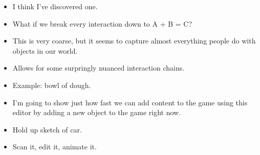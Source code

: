 \documentclass[12pt]{article}
\begin{document}
{\begin{itemize}
\item I think I've discovered one.

\item What if we break every interaction down to A + B = C?

\item This is very coarse, but it seems to capture almost everything people do with objects in our world.

\item Allows for some surpringly nuanced interaction chains.

\item Example:  bowl of dough.

\item I'm going to show just how fast we can add content to the game using this editor by adding a new object to the game right now.

\item Hold up sketch of car.

\item Scan it, edit it, animate it.

\end{itemize}

}
\end{document}
